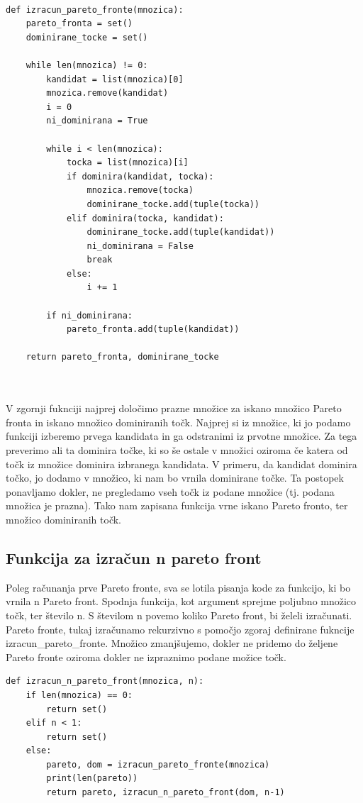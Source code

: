 \documentclass{article}
\begin{document}
\begin{verbatim}

def izracun_pareto_fronte(mnozica): 
    pareto_fronta = set()
    dominirane_tocke = set()

    while len(mnozica) != 0:
        kandidat = list(mnozica)[0] 
        mnozica.remove(kandidat)
        i = 0
        ni_dominirana = True 

        while i < len(mnozica):
            tocka = list(mnozica)[i]
            if dominira(kandidat, tocka): 
                mnozica.remove(tocka)
                dominirane_tocke.add(tuple(tocka))
            elif dominira(tocka, kandidat):
                dominirane_tocke.add(tuple(kandidat))
                ni_dominirana = False
                break
            else:
                i += 1

        if ni_dominirana:   
            pareto_fronta.add(tuple(kandidat))
        
    return pareto_fronta, dominirane_tocke

  
\end{verbatim}

V zgornji fuknciji najprej določimo prazne množice za iskano množico Pareto fronta in iskano množico dominiranih točk. Najprej si iz množice, ki jo podamo funkciji izberemo prvega kandidata in ga odstranimi iz prvotne množice. Za tega preverimo ali ta dominira točke, ki so še ostale v množici oziroma če katera od točk iz množice dominira izbranega kandidata. V primeru, da kandidat dominira točko, jo dodamo v množico, ki nam bo vrnila dominirane točke.  Ta postopek ponavljamo dokler, ne pregledamo vseh točk iz podane množice (tj. podana množica je prazna). Tako nam zapisana funkcija vrne iskano Pareto fronto, ter množico dominiranih točk.


\subsection{Funkcija za izračun n pareto front}
Poleg računanja prve Pareto fronte, sva se lotila pisanja kode za funkcijo, ki bo vrnila n Pareto front. Spodnja funkcija, kot argument sprejme poljubno množico točk, ter število n. S številom n povemo koliko Pareto front, bi želeli izračunati. Pareto fronte, tukaj izračunamo rekurzivno s pomočjo zgoraj definirane fukncije izracun\_pareto\_fronte. Množico zmanjšujemo, dokler ne pridemo do željene Pareto fronte oziroma dokler ne izpraznimo podane možice točk.

\begin{verbatim}
def izracun_n_pareto_front(mnozica, n): 
    if len(mnozica) == 0:   
        return set()
    elif n < 1:
        return set()    
    else:
        pareto, dom = izracun_pareto_fronte(mnozica)
        print(len(pareto))  
        return pareto, izracun_n_pareto_front(dom, n-1)
\end{verbatim}
\end{document}
